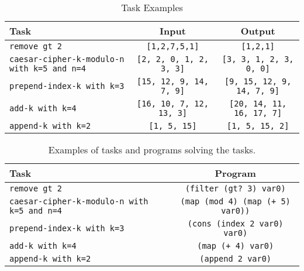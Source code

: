 \begin{table}[H]
    \centering
    \begin{tabular}{|p{5cm}|c|c|}
        \hline
        \textbf{Task} & \textbf{Input} & \textbf{Output} \\\hline
        \texttt{remove gt 2} & \texttt{[1,2,7,5,1]} & \texttt{[1,2,1]} \\\hline
        \texttt{caesar-cipher-k-modulo-n with k=5 and n=4} & \texttt{[2, 2, 0, 1, 2, 3, 3]} & \texttt{[3, 3, 1, 2, 3, 0, 0]} \\\hline
        \texttt{prepend-index-k with k=3} & \texttt{[15, 12, 9, 14, 7, 9]} & \texttt{[9, 15, 12, 9, 14, 7, 9]} \\\hline
        \texttt{add-k with k=4} & \texttt{[16, 10, 7, 12, 13, 3]} & \texttt{[20, 14, 11, 16, 17, 7]} \\\hline
        \texttt{append-k with k=2} & \texttt{[1, 5, 15]} & \texttt{[1, 5, 15, 2]} \\\hline
    \end{tabular}
    \caption{Task Examples}
    \label{tab:task_ex}
\end{table}



\begin{table}[H]
    \centering
    \begin{tabular}{|p{5cm}|c|}
        \hline
        \textbf{Task} & \textbf{Program} \\\hline
        \texttt{remove gt 2} & \texttt{(filter (gt? 3) var0)} \\\hline
        \texttt{caesar-cipher-k-modulo-n with k=5 and n=4} & \texttt{(map (mod 4) (map (+ 5) var0))} \\\hline
        \texttt{prepend-index-k with k=3} & \texttt{(cons (index 2 var0) var0)} \\\hline
        \texttt{add-k with k=4} & \texttt{(map (+ 4) var0)} \\\hline
        \texttt{append-k with k=2} & \texttt{(append 2 var0)} \\\hline
    \end{tabular}
    \caption{Examples of tasks and programs solving the tasks.}
    \label{tab:task_programs}
\end{table}
